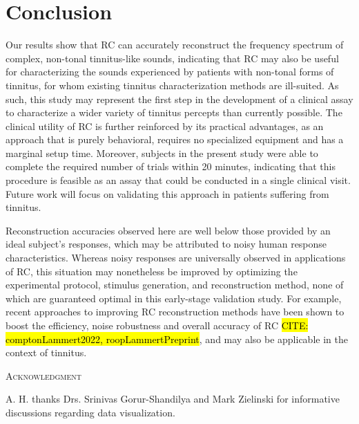 \documentclass[journal]{IEEEtran}
\begin{document}
\section{Conclusion}

Our results show that RC can accurately reconstruct the frequency spectrum of complex, non-tonal tinnitus-like sounds,
indicating that RC may also be useful for characterizing the sounds experienced by patients with non-tonal forms of tinnitus,
for whom existing tinnitus characterization methods are ill-suited.
As such, this study may represent the first step in the development of a clinical assay to characterize a wider variety of tinnitus percepts than currently possible.
The clinical utility of RC is further reinforced by its practical advantages,
as an approach that is purely behavioral, requires no specialized equipment and has a marginal setup time.
Moreover, subjects in the present study were able to complete the required number of trials within 20 minutes,
indicating that this procedure is feasible as an assay that could be conducted in a single clinical visit.
Future work will focus on validating this approach in patients suffering from tinnitus.

Reconstruction accuracies observed here are well below those provided by an ideal subject's responses,
which may be attributed to noisy human response characteristics.
Whereas noisy responses are universally observed in applications of RC,
this situation may nonetheless be improved by optimizing the experimental protocol, stimulus generation, and reconstruction method,
none of which are guaranteed optimal in this early-stage validation study.
For example, recent approaches to improving RC reconstruction methods have been shown to boost the efficiency, noise robustness and overall accuracy of RC \hl{CITE: comptonLammert2022, roopLammertPreprint},
and may also be applicable in the context of tinnitus.

\textsc{Acknowledgment}
\par A. H. thanks Drs. Srinivas Gorur-Shandilya and Mark Zielinski for informative discussions regarding data visualization.
\end{document}
